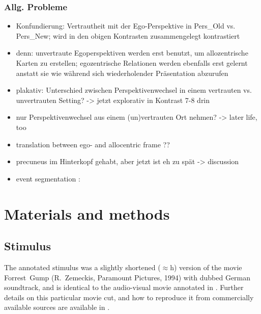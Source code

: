 \documentclass[10pt,a4paper,twocolumn]{article}
\begin{document}
\subsubsection*{Allg. Probleme}
\begin{itemize}
	\item Konfundierung: Vertrautheit mit der Ego-Perspektive in Pers\_Old vs.
	Pers\_New; wird in den obigen Kontrasten zusammengelegt kontrastiert 
	\item denn: unvertraute Egoperspektiven werden erst benutzt, um allozentrische
	Karten zu erstellen; egozentrische Relationen werden ebenfalls erst
	gelernt anstatt sie wie während sich wiederholender Präsentation abzurufen 
	\item plakativ: Unterschied zwischen Perspektivenwechsel in einem vertrauten
	vs. unvertrauten Setting? -> jetzt explorativ in Kontrast 7-8 drin
	\item nur Perspektivenwechsel aus einem (un)vertrauten Ort nehmen? -> later
	life, too
	\item translation between ego- and allocentric frame ?? \citet{burgess_2002_human_hippocampus_spatial_episodic_memory_review}
	\item precuneus im Hinterkopf gehabt, aber jetzt ist eh zu spät -> discussion
	\item event segmentation \citep{zacks_2010_brains_cutting_room}: 
\end{itemize}




\section*{Materials and methods}

\subsection*{Stimulus}

The annotated stimulus was a slightly shortened ($\approx$\unit[2]{h}) version
of the movie Forrest~Gump (R.~Zemeckis, Paramount Pictures, 1994) with dubbed
German soundtrack, and is identical to the audio-visual movie annotated in
\cite{LRS+2015}. Further details on this particular movie cut, and how to
reproduce it from commercially available sources are available in
\cite{HAK+16}.
\end{document}
